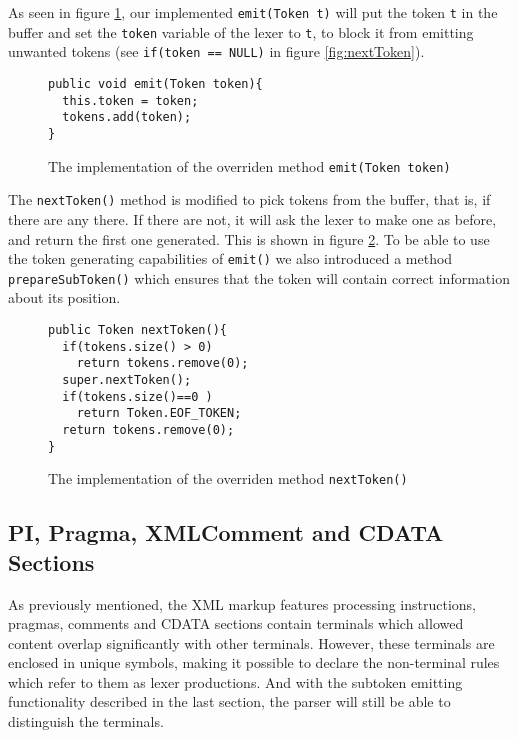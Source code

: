 As seen in figure \ref{fig:emitToken}, our implemented \verb!emit(Token t)!
will put the token \verb!t! in the buffer and set the \verb!token! variable of the lexer to \verb!t!, to block it from emitting unwanted tokens (see \verb!if(token == NULL)! in figure \ref{fig:nextToken}).
\begin{figure}[h!]
\begin{Verbatim}
public void emit(Token token){
  this.token = token;
  tokens.add(token);
}
\end{Verbatim}
\caption[The overridden \texttt{emit(Token t)}]{The implementation of the overriden method \texttt{emit(Token token)}}
\label{fig:emitToken}
\end{figure}

The \verb!nextToken()! method is modified to pick tokens from the buffer, that is, if there are any there. If there are not, it will ask the lexer to make one as before, and return the first one generated. This is shown in figure \ref{fig:newNextToken}. To be able to use the token generating capabilities of \verb!emit()! we also introduced a method \verb!prepareSubToken()! which ensures that the token will contain correct information about its position.

\begin{figure}[h!]
\begin{Verbatim}
public Token nextToken(){
  if(tokens.size() > 0)
    return tokens.remove(0);
  super.nextToken();
  if(tokens.size()==0 )
    return Token.EOF_TOKEN;
  return tokens.remove(0);
}
\end{Verbatim}
\caption[The overridden \texttt{nextToken()}]{The implementation of the overriden method \texttt{nextToken()}}
\label{fig:newNextToken}
\end{figure}


\subsection{PI, Pragma, XMLComment and CDATA Sections}

As previously mentioned, the XML markup features processing instructions, pragmas, comments and CDATA sections contain terminals which allowed content overlap significantly with other terminals. However, these terminals are enclosed in unique symbols, making it possible to declare the non-terminal rules which refer to them as lexer productions. And with the subtoken emitting functionality described in the last section, the parser will still be able to distinguish the terminals. 

